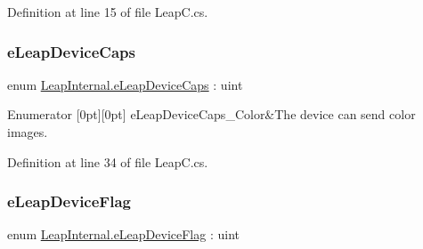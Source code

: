 Definition at line 15 of file Leap\+C.\+cs.

\mbox{\label{namespace_leap_internal_abaf362ab57323da251a6eb1444092a4b}} 
\subsubsection{\texorpdfstring{eLeapDeviceCaps}{eLeapDeviceCaps}}
{\footnotesize\ttfamily enum \mbox{\hyperlink{namespace_leap_internal_abaf362ab57323da251a6eb1444092a4b}{Leap\+Internal.\+e\+Leap\+Device\+Caps}} \+: uint\hspace{0.3cm}{\ttfamily [strong]}}

\begin{DoxyEnumFields}{Enumerator}
[0pt][0pt]{}\mbox{\label{namespace_leap_internal_abaf362ab57323da251a6eb1444092a4ba13503efceadfd067a6ca2696d01cae9b}} 
e\+Leap\+Device\+Caps\+\_\+\+Color&The device can send color images. \\
\hline

\end{DoxyEnumFields}


Definition at line 34 of file Leap\+C.\+cs.

\mbox{\label{namespace_leap_internal_ac070f7da620782f2faeb48f6b5774672}} 
\subsubsection{\texorpdfstring{eLeapDeviceFlag}{eLeapDeviceFlag}}
{\footnotesize\ttfamily enum \mbox{\hyperlink{namespace_leap_internal_ac070f7da620782f2faeb48f6b5774672}{Leap\+Internal.\+e\+Leap\+Device\+Flag}} \+: uint\hspace{0.3cm}{\ttfamily [strong]}}

